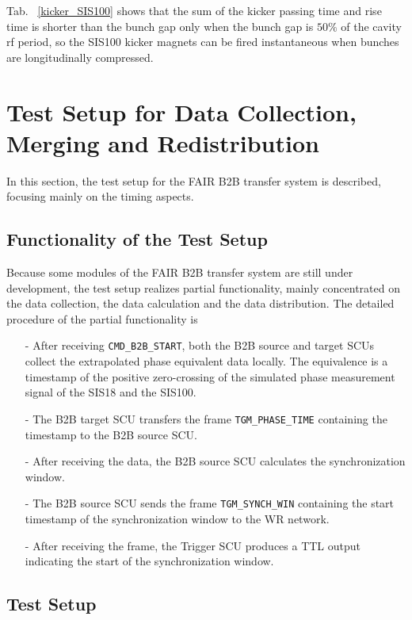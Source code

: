 Tab. ~\ref{kicker_SIS100} shows that the sum of the kicker passing time and rise time is shorter than the bunch gap only when the bunch gap is $50\%$ of the cavity rf period, so the SIS100 kicker magnets can be fired instantaneous when bunches are longitudinally compressed. 
\section{Test Setup for Data Collection, Merging and Redistribution}
\label{real_test}

In this section, the test setup for the FAIR B2B transfer system is described, focusing mainly on the timing aspects.  

\subsection{Functionality of the Test Setup}
Because some modules of the FAIR B2B transfer system are still under development, the test setup realizes partial functionality,  mainly concentrated on the data collection, the data calculation and the data distribution. The detailed procedure of the partial functionality is
\begin{itemize}
\item[-] After receiving \verb|CMD_B2B_START|, both the B2B source and target SCUs collect the extrapolated phase equivalent data locally. The equivalence is a timestamp of the positive zero-crossing of the simulated phase measurement signal of the SIS18 and the SIS100. 
\item[-] The B2B target SCU transfers the frame \verb|TGM_PHASE_TIME| containing the timestamp to the B2B source SCU.
\item[-] After receiving the data, the B2B source SCU calculates the synchronization window.
\item[-] The B2B source SCU sends the frame \verb|TGM_SYNCH_WIN| containing the start timestamp of the synchronization window to the WR network.
\item[-] After receiving the frame, the Trigger SCU produces a TTL output indicating the start of the synchronization window. 
\end{itemize}

\subsection{Test Setup}

